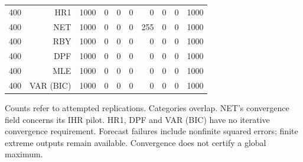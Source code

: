 \begin{table}[p]
\begin{tabular}{rrrrrrrrrr}
400 & HR1 & 1000 & 0 & 0 & 0 &   0 & 0 & 0 & 1000 \\
400 & NET & 1000 & 0 & 0 & 0 & 255 & 0 & 0 & 1000 \\
400 & RBY & 1000 & 0 & 0 & 0 &   0 & 0 & 0 & 1000 \\
400 & DPF & 1000 & 0 & 0 & 0 &   0 & 0 & 0 & 1000 \\
400 & MLE & 1000 & 0 & 0 & 0 &   0 & 0 & 0 & 1000 \\
400 & VAR (BIC) & 1000 & 0 & 0 & 0 &   0 & 0 & 0 & 1000 \\
\bottomrule\end{tabular}
\par\medskip
\begin{minipage}{0.98\linewidth}\footnotesize Counts refer to attempted replications. Categories overlap. NET's convergence field concerns its IHR pilot. HR1, DPF and VAR (BIC) have no iterative convergence requirement. Forecast failures include nonfinite squared errors; finite extreme outputs remain available. Convergence does not certify a global maximum.\end{minipage}
\end{table}
